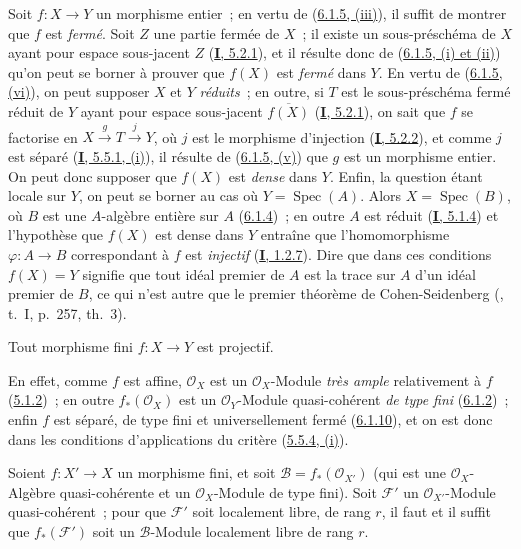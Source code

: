 Soit $f:X\to Y$ un morphisme entier~; en vertu de
(\hyperref[II.6.1.5-fr]{6.1.5, (iii)}), il suffit de montrer que $f$ est
\emph{fermé}. Soit $Z$ une partie fermée de $X$~; il existe un sous-préschéma de $X$
ayant
pour espace sous-jacent $Z$ (\hyperref[I.5.2.1-fr]{\textbf{I}, 5.2.1}), et il résulte
donc de (\hyperref[II.6.1.5-fr]{6.1.5, (i) et (ii)}) qu'on peut se borner à
prouver que $f(X)$ est \emph{fermé} dans $Y$. En vertu de
(\hyperref[II.6.1.5-fr]{6.1.5, (vi)}), on peut supposer $X$ et $Y$ \emph{réduits}~;
en outre, si $T$ est le sous-préschéma fermé réduit de $Y$ ayant pour espace
sous-jacent $\overline{f(X)}$ (\hyperref[I.5.2.1-fr]{\textbf{I}, 5.2.1}), on sait que
$f$ se factorise en $X\xrightarrow{g}T\xrightarrow{j}Y$, où $j$ est le
morphisme d'injection (\hyperref[I.5.2.2-fr]{\textbf{I}, 5.2.2}), et comme $j$ est
séparé (\hyperref[I.5.5.1-fr]{\textbf{I}, 5.5.1, (i)}), il résulte de
(\hyperref[II.6.1.5-fr]{6.1.5, (v)}) que $g$ est un morphisme entier. On peut
donc supposer que $f(X)$ est \emph{dense} dans $Y$. Enfin, la question étant locale
sur $Y$, on peut se borner au cas où $Y=\operatorname{Spec}(A)$. Alors
$X=\operatorname{Spec}(B)$, où $B$ est une $A$-algèbre entière sur $A$
(\hyperref[II.6.1.4-fr]{6.1.4})~; en outre $A$ est réduit
(\hyperref[I.5.1.4-fr]{\textbf{I}, 5.1.4}) et l'hypothèse que $f(X)$ est dense dans
$Y$ entraîne que l'homomorphisme $\varphi:A\to B$ correspondant à $f$ est
\emph{injectif} (\hyperref[I.1.2.7-fr]{\textbf{I}, 1.2.7}). Dire que dans ces conditions
$f(X)=Y$ signifie que tout idéal premier de $A$ est la trace sur $A$ d'un
idéal premier de $B$, ce qui n'est autre que le premier théorème de
Cohen-Seidenberg (\cite{I-13}, t.~I, p.~257, th.~3).

\begin{corollary}[6.1.11]
\label{II.6.1.11-fr}
Tout morphisme fini $f:X\to Y$ est projectif.
\end{corollary}

En effet, comme $f$ est affine, $\mathcal{O}_X$ est un
$\mathcal{O}_X$-Module \emph{très ample} relativement à $f$
(\hyperref[II.5.1.2-fr]{5.1.2})~; en outre $f_*(\mathcal{O}_X)$ est un
$\mathcal{O}_Y$-Module quasi-cohérent \emph{de type fini}
(\hyperref[II.6.1.2-fr]{6.1.2})~; enfin $f$ est séparé, de type fini et
universellement fermé (\hyperref[II.6.1.10-fr]{6.1.10}), et on est donc dans
les conditions d'applications du critère
(\hyperref[II.5.5.4-fr]{5.5.4, (i)}).

\begin{proposition}[6.1.12]
\label{II.6.1.12-fr}
Soient $f:X'\to X$ un morphisme fini, et soit
$\mathcal{B}=f_*(\mathcal{O}_{X'})$ (qui est une $\mathcal{O}_X$-Algèbre
quasi-cohérente et un $\mathcal{O}_X$-Module de type fini). Soit
$\mathcal{F}'$ un $\mathcal{O}_{X'}$-Module quasi-cohérent~; pour que
$\mathcal{F}'$ soit localement libre, de rang $r$, il faut et il suffit que
$f_*(\mathcal{F}')$ soit un $\mathcal{B}$-Module localement libre de rang
$r$.
\end{proposition}

